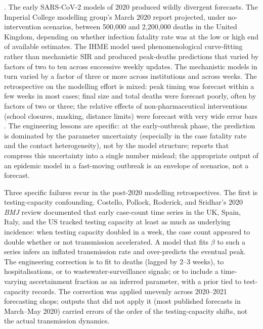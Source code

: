 . The early SARS-CoV-2
models of 2020 produced wildly divergent forecasts. The Imperial
College modelling group's March 2020 report
\cite[pp.~5--7]{paper:v6c08-ferguson-imperial-r9-2020} projected, under
no-intervention scenarios, between 500{,}000 and 2{,}200{,}000
deaths in the United Kingdom, depending on whether infection
fatality rate was at the low or high end of available estimates.
The IHME model used phenomenological curve-fitting rather than
mechanistic SIR and produced peak-deaths predictions that varied by
factors of two to ten across successive weekly updates. The
mechanistic models in turn varied by a factor of three or more
across institutions and across weeks. The retrospective on the
modelling effort is mixed: peak timing was forecast within a few
weeks in most cases; final size and total deaths were forecast
poorly, often by factors of two or three; the relative effects of
non-pharmaceutical interventions (school closures, masking,
distance limits) were forecast with very wide error bars
\cite{paper:v6c08-adam-2020-models}. The engineering lessons are
specific: at the early-outbreak phase, the prediction is dominated
by the parameter uncertainty (especially in the case fatality rate
and the contact heterogeneity), not by the model structure; reports
that compress this uncertainty into a single number mislead; the
appropriate output of an epidemic model in a fast-moving outbreak is
an envelope of scenarios, not a forecast.

Three specific failures recur in the post-2020 modelling
retrospectives. The first is testing-capacity confounding. Costello,
Pollock, Roderick, and Sridhar's 2020 \emph{BMJ} review
\cite[pp.~m1567-1--m1567-3]{paper:v6c08-costello-testing-2020}
documented that early case-count time series in the UK, Spain,
Italy, and the US tracked testing capacity at least as much as
underlying incidence: when testing capacity doubled in a week, the
case count appeared to double whether or not transmission accelerated.
A model that fits $\beta$ to such a series infers an inflated
transmission rate and over-predicts the eventual peak. The
engineering correction is to fit to deaths (lagged by 2--3 weeks),
to hospitalisations, or to wastewater-surveillance signals; or to
include a time-varying ascertainment fraction as an inferred
parameter, with a prior tied to test-capacity records. The
correction was applied unevenly across 2020--2021 forecasting
shops; outputs that did not apply it (most published forecasts in
March--May 2020) carried errors of the order of the testing-capacity
shifts, not the actual transmission dynamics.

